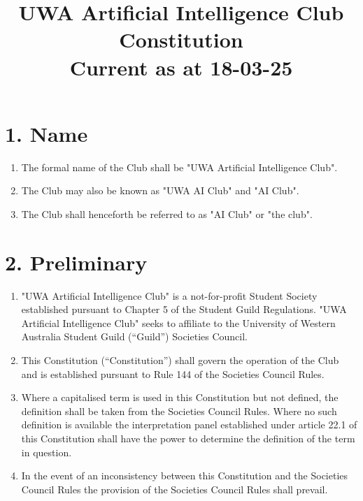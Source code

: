 \documentclass[12pt]{article}
\title{UWA Artificial Intelligence Club Constitution\\
\large Current as at 18-03-25}
\date{}
\renewcommand{\contentsname}{\normalsize\textbf{Table of Contents}}
\begin{document}
\maketitle
\vspace{-8em} 
\renewcommand{\contentsname}{}
\tableofcontents
\clearpage
\normalsize
\section{1. Name}
\begin{enumerate}[label=1.\arabic*]
 \item The formal name of the Club shall be "UWA Artificial Intelligence Club".
 \item The Club may also be known as "UWA AI Club" and "AI Club".
 \item The Club shall henceforth be referred to as "AI Club" or "the club".
\end{enumerate}

\section{2. Preliminary}
\begin{enumerate}[label=2.\arabic*]
 \item "UWA Artificial Intelligence Club" is a not-for-profit Student Society established pursuant to Chapter 5 of the Student Guild Regulations. "UWA Artificial Intelligence Club" seeks to affiliate to the University of Western Australia Student Guild (“Guild”) Societies Council.
 \item This Constitution (“Constitution”) shall govern the operation of the Club and is established pursuant to Rule 144 of the Societies Council Rules.
\item Where a capitalised term is used in this Constitution but not defined, the definition shall be taken from the Societies Council Rules. Where no such definition is available the interpretation panel established under article 22.1 of this Constitution shall have the power to determine the definition of the term in question.
\item In the event of an inconsistency between this Constitution and the Societies Council Rules the provision of the Societies Council Rules shall prevail.
\end{enumerate}
\end{document}
